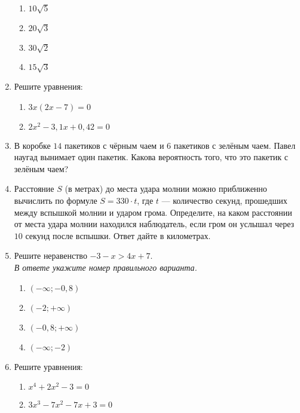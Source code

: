 \documentclass[12pt, a4paper]{article}
\begin{document}
\begin{enumerate}
\begin{multicols}{4}
			\begin{enumerate}[label=\arabic*)]
				\item $10\sqrt{5}$
				\item $20\sqrt{3}$
				\item $30\sqrt{2}$
				\item $15\sqrt{3}$
			\end{enumerate}
		\end{multicols}
		\item Решите уравнения:
		\begin{multicols}{2}
			\begin{enumerate}[label=\arabic*)]
				\item $3x(2x-7)=0$
				\item $2x^2-3,1x+0,42=0$
			\end{enumerate}
		\end{multicols}
		\item В коробке $14$ пакетиков с чёрным чаем и $6$ пакетиков с зелёным чаем. Павел наугад вынимает один пакетик. Какова вероятность того, что это пакетик с зелёным чаем?
		\item Расстояние $S$ (в метрах) до места удара молнии можно приближенно вычислить по формуле $S=330\cdot t$, где $t$ --- количество секунд, прошедших между вспышкой молнии и ударом грома. Определите, на каком расстоянии от места удара молнии находился наблюдатель, если гром он услышал через $10$ секунд после вспышки. Ответ дайте в километрах.
		\item Решите неравенство $-3-x>4x+7$.\\ \textit{В ответе укажите номер правильного варианта.}
		\begin{multicols}{2}
			\begin{enumerate}[label=\arabic*)]
				\item $(-\infty;-0,8)$
				\item $(-2;+\infty)$
				\item $(-0,8;+\infty)$
				\item $(-\infty;-2)$
			\end{enumerate}
		\end{multicols}
		\item Решите уравнения:
		\begin{multicols}{2}
			\begin{enumerate}[label=\asbuk*)]
			\item $x^4+2x^2-3=0$
			\item $3x^3-7x^2-7x+3=0$
			\end{enumerate}
		\end{multicols}
	\end{enumerate}
\end{document}
